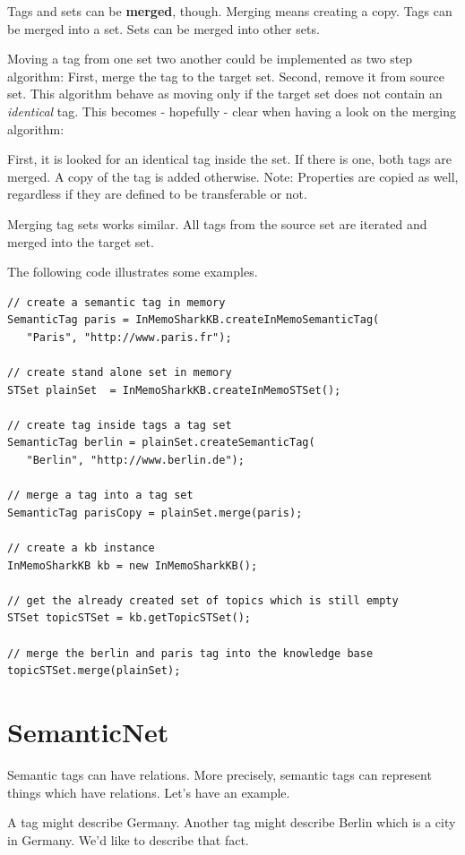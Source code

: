 Tags and sets can be {\bf merged}, though. Merging means creating a copy.
Tags can be merged into a set. Sets can be merged into other sets.

Moving a tag from one set two another could be implemented as two step algorithm: First, merge the tag to the target set. Second, remove it from source set. This algorithm behave as moving only if the target set does not contain an {\it identical} tag. This becomes - hopefully - clear when having a look on the merging algorithm:

First, it is looked for
an identical tag inside the set. If there is one, both tags are merged. A copy of the tag is added otherwise. Note: Properties are copied as well, regardless if they are defined to be transferable or not.

Merging tag sets works similar. All tags from the source set are iterated and merged into the target set.

The following code illustrates some examples.

\begin{verbatim}
// create a semantic tag in memory
SemanticTag paris = InMemoSharkKB.createInMemoSemanticTag(
   "Paris", "http://www.paris.fr");

// create stand alone set in memory
STSet plainSet  = InMemoSharkKB.createInMemoSTSet();

// create tag inside tags a tag set
SemanticTag berlin = plainSet.createSemanticTag(
   "Berlin", "http://www.berlin.de");

// merge a tag into a tag set
SemanticTag parisCopy = plainSet.merge(paris);

// create a kb instance
InMemoSharkKB kb = new InMemoSharkKB();

// get the already created set of topics which is still empty
STSet topicSTSet = kb.getTopicSTSet();

// merge the berlin and paris tag into the knowledge base
topicSTSet.merge(plainSet);
\end{verbatim}

\section{SemanticNet}
Semantic tags can have relations. More precisely, semantic tags can represent things which have relations. Let's have an example.

A tag might describe Germany. Another tag might describe Berlin which is a city in Germany. We'd like to describe that fact.

